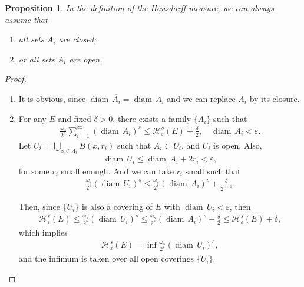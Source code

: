 \documentclass[11pt]{book}
\newtheorem{proposition}{Proposition}[chapter]
\theoremstyle{definition}
\numberwithin{equation}{chapter}
\def\H{{\mathcal H}}
\def\diam{{\operatorname{diam}\,}}
\begin{document}
\begin{proposition}\label{prop_15}
In the definition of the Hausdorff measure, we can always assume that
\begin{enumerate}[label=(\alph*)]
    \item all sets $A_i$ are closed;
    
    \item or all sets $A_i$ are open.
\end{enumerate}
\end{proposition}
\begin{proof}
~\begin{enumerate}[label=(\alph*)]
    \item It is obvious, since $\diam \overline{A_i} = \diam A_i$ and we can replace $A_i$ by its closure.
    
    \item For any $E$ and fixed $\delta > 0$, there exists a family $\{A_i\}$ such that
    \begin{align*}
        \frac{\omega_s}{2^s} \sum^\infty_{i=1} (\diam A_i)^s \leq \H^s_{\varepsilon}(E) + \frac{\delta}{2}, \quad \diam A_i < \varepsilon.
    \end{align*}
    Let $U_i = \bigcup_{x \in A_i} B(x, r_i)$ such that $A_i \subset U_i$, and $U_i$ is open. Also, 
    \begin{align*}
        \diam U_i \leq \diam A_i + 2r_i < \varepsilon,
    \end{align*}
    for some $r_i$ small enough. And we can take $r_i$ small such that
    \begin{align*}
        \frac{\omega_s}{2^s} (\diam U_i)^s \leq \frac{\omega_s}{2^s} (\diam A_i)^s + \frac{\delta}{2^{i+1}}.
    \end{align*}
    
    Then, since $\{U_i\}$ is also a covering of $E$ with $\diam U_i < \varepsilon$, then
    \begin{align*}
        \H^s_{\varepsilon}(E) \leq \frac{\omega_s}{2^s} (\diam U_i)^s \leq \frac{\omega_s}{2^s} (\diam A_i)^s + \frac{\delta}{2} \leq \H^s_{\varepsilon}(E) + \delta,
    \end{align*}
    which implies
    \begin{align*}
        \H^s_{\varepsilon}(E) = \inf \frac{\omega_s}{2^s} (\diam U_i)^s,
    \end{align*}
    and the infimum is taken over all open coverings $\{U_i\}$.
\end{enumerate}
\end{proof}
\end{document}

